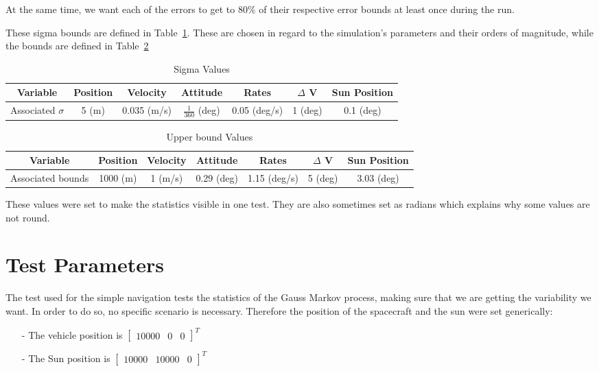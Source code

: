 At the same time, we want each of the errors to get to $80\%$ of their respective error bounds
at least once during the run.

These sigma bounds are defined in Table~\ref{tab:sigmas}. These are chosen in regard to
the simulation's parameters and their orders of magnitude, while the bounds are defined in
Table~\ref{tab:bounds}

\begin{table}[htbp]
    \caption{Sigma Values}
\label{tab:sigmas}
    \centering \fontsize{10}{10}\selectfont
\begin{tabular}{|c||c|c|c|c|c|c|}
\hline
Variable & Position & Velocity & Attitude & Rates & $\Delta$ V & Sun Position \\ \hline \hline
Associated $\sigma$ & 5 (m)& 0.035 (m/s)& $\frac{1}{360}$ (deg) & 0.05 (deg/s) & 1 (deg) & 0.1 (deg) \\ \hline 
\end{tabular}
\end{table}

\begin{table}[htbp]
    \caption{Upper bound Values}
\label{tab:bounds}
    \centering \fontsize{10}{10}\selectfont
\begin{tabular}{|c||c|c|c|c|c|c|}
\hline
Variable & Position & Velocity & Attitude & Rates & $\Delta$ V & Sun Position \\ \hline \hline
Associated bounds & 1000 (m)& 1 (m/s)& 0.29 (deg) & 1.15 (deg/s) & 5 (deg) & 3.03 (deg) \\ \hline 
\end{tabular}
\end{table}

These values were set to make the statistics visible in one test. They are also sometimes set as radians which explains why some values are not round.



\section{Test Parameters}

The test used for the simple navigation tests the statistics of the Gauss Markov process, making sure that we are getting the variability we want. In order to do so, no specific scenario is necessary. Therefore the position of the spacecraft and the sun were set generically:

\begin{itemize}
	\item[-] The vehicle position is $\begin{bmatrix}10000 & 0 & 0 \end{bmatrix}^T$
	\item[-] The Sun position is  $\begin{bmatrix}10000 & 10000 & 0 \end{bmatrix}^T$
\end{itemize}

